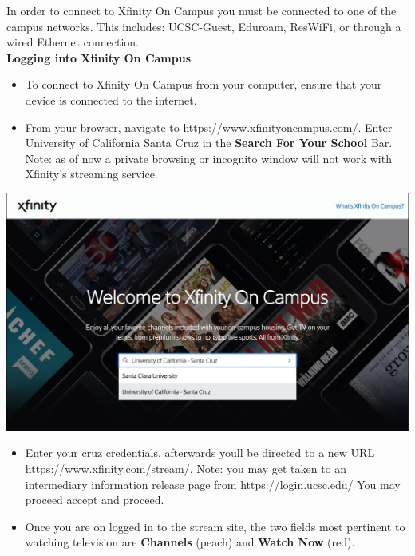 \documentclass[a4paper, 11pt]{article}
\begin{document}
In order to connect to Xfinity On Campus you must be connected to one of the
campus networks.  This includes: UCSC-Guest, Eduroam, ResWiFi, or through a 
wired Ethernet connection.\\
{\newline}
\textbf{Logging into Xfinity On Campus}
\begin{itemize}
  \item To connect to Xfinity On Campus from your computer, ensure that your device  is connected to the internet. 
  \item From your browser, navigate to https://www.xfinityoncampus.com/.  Enter University of California Santa Cruz in the 
  \textbf{Search For Your School} Bar.
  Note: as of now a private browsing or incognito window will not work with
  Xfinity's streaming service.
\end{itemize}
\includegraphics[width=\linewidth, height=\textheight, keepaspectratio]{welcome.png}
\begin{itemize}
  \item Enter your cruz credentials, afterwards youll be directed to a new URL
  https://www.xfinity.com/stream/.  Note: you may get taken to an intermediary
  information release page from 
  https://login.ucsc.edu/  You may proceed accept and proceed.

  \item Once you are on logged in to the stream site, the two fields most
  pertinent to watching television are \textbf{Channels} (peach) and 
  \textbf{Watch Now}
  (red).
\end{itemize}
\end{document}
